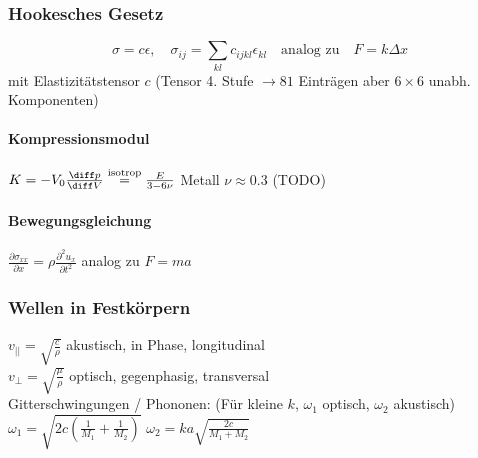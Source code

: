 \begin{sectionbox}
    \subsubsection{Hookesches Gesetz}
    \begin{equation*}
        \sigma = c\epsilon, \quad \sigma_{ij}=\sum_{kl}c_{ijkl}\epsilon_{kl} \quad \text{analog zu} \quad F=k\Delta x
    \end{equation*}
    mit Elastizitätstensor $c$ (Tensor 4. Stufe $\rightarrow 81$ Einträgen aber $6\times 6$ unabh. Komponenten)
    \paragraph{Kompressionsmodul} $K = - V_0 \frac{\diff p}{\diff V} \overset{\text{isotrop}}{=} \frac{E}{3-6\nu}$ \quad Metall $\nu \approx 0.3$ (TODO)
    \paragraph{Bewegungsgleichung} $\frac{\partial \sigma_{xx}}{\partial x} = \rho\frac{\partial^2 u_x}{\partial t^2}$ analog zu $F=ma$

    \subsubsection{Wellen in Festkörpern}
    $v_{||} = \sqrt{\frac{c}{\rho}}$ akustisch, in Phase, longitudinal \\
    $v_{\perp} = \sqrt{\frac{\mu}{\rho}}$ optisch, gegenphasig, transversal \\
    Gitterschwingungen / Phononen: (Für kleine $k$, $\omega_1$ optisch, $\omega_2$ akustisch)\\
    $\omega_1 = \sqrt{2 c (\frac{1}{M_1} + \frac{1}{M_2})}$ \qquad $\omega_2 = ka\sqrt{ \frac{2 c}{M_1 + M_2}}$
\end{sectionbox}



